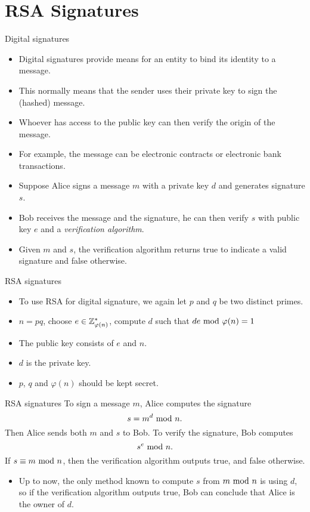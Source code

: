 \section{RSA Signatures}
\begin{frame}{\VideoName}
    \tableofcontents[currentsection]
\end{frame}

\begin{frame}{Digital signatures}
    \begin{itemize}
        \item Digital signatures provide means for an entity to bind its identity to a message. 
        \item This normally means that the sender uses their private key to sign the (hashed) message. 
        \item Whoever has access to the public key can then verify the origin of the message.
        \item For example, the message can be electronic contracts or electronic bank transactions.
        \item Suppose Alice signs a message $m$ with a private key $d$ and generates signature $s$.
        \item Bob receives the message and the signature, he can then verify $s$ with public key $e$ and a \textit{verification algorithm}.
        \item Given $m$ and $s$, the verification algorithm returns true to indicate a valid signature and false otherwise.
    \end{itemize}
\end{frame}

\begin{frame}{RSA signatures}
    \begin{itemize}
        \item To use RSA for digital signature, we again let $p$ and $q$ be two distinct primes.
        \item $n=pq$, choose $e\in{\mathbb Z}_{\varphi(n)}^*$, compute $d$ such that $de\textrm{~mod~}\varphi(n)=1$
        \item The public key consists of $e$ and $n$.
        \item $d$ is the private key.
        \item $p$, $q$ and $\varphi(n)$ should be kept secret.
    \end{itemize}
\end{frame}

\begin{frame}{RSA signatures}
To sign a message $m$, Alice computes the signature
\[
s=m^d\textrm{~mod~} n.
\]
Then Alice sends both $m$ and $s$ to Bob.
To verify the signature, Bob computes
\[
s^e\textrm{~mod~} n.
\]
If $s\equiv m\textrm{~mod~} n$, then the verification algorithm outputs true, and false otherwise.
\begin{itemize}
    \item Up to now, the only method known to compute $s$ from $m\textrm{~mod~} n$ is using $d$, so if the verification algorithm outputs true, Bob can conclude that Alice is the owner of $d$.
\end{itemize}
\end{frame}

